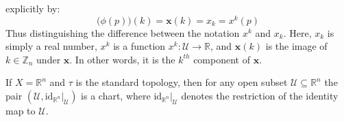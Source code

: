 \documentclass[oneside]{book}                                                  %
\begin{document}
            explicitly by:
            \begin{equation}
                \big(\phi(p)\big)(k)=\mathbf{x}(k)=x_{k}=x^{k}(p)
            \end{equation}
            Thus distinguishing the difference between the notation $x^{k}$ and $x_{k}$.
            Here, $x_{k}$ is simply a real number, $x^{k}$ is a function
            $x^{k}:\mathcal{U}\rightarrow\mathbb{R}$, and $\mathbf{x}(k)$ is the image
            of $k\in\mathbb{Z}_{n}$ under $\mathbf{x}$. In other words, it is the
            $k^{th}$ component of $\mathbf{x}$.
            \begin{example}
                If $X=\mathbb{R}^{n}$ and $\tau$ is the standard topology, then
                for any open subset $\mathcal{U}\subseteq\mathbb{R}^{n}$ the
                pair $(\mathcal{U},\textrm{id}_{\mathbb{R}^{n}}|_{\mathcal{U}})$
                is a chart, where $\textrm{id}_{\mathbb{R}^{n}}|_{\mathcal{U}}$
                denotes the restriction of the identity map to $\mathcal{U}$.
            \end{example}
\end{document}
